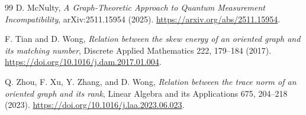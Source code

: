 \documentclass[11pt,a4paper]{article}
\theoremstyle{remark}
\begin{document}
\begin{thebibliography}{99}
D. McNulty, \emph{A Graph-Theoretic Approach to Quantum Measurement
Incompatibility}, arXiv:2511.15954 (2025).
\url{https://arxiv.org/abs/2511.15954}.

F. Tian and D. Wong, \emph{Relation between the skew energy of an oriented
graph and its matching number}, Discrete Applied Mathematics 222, 179--184
(2017). \url{https://doi.org/10.1016/j.dam.2017.01.004}.

Q. Zhou, F. Xu, Y. Zhang, and D. Wong,
\emph{Relation between the trace norm of an oriented graph and its rank},
Linear Algebra and its Applications 675, 204--218 (2023).
\url{https://doi.org/10.1016/j.laa.2023.06.023}.
\end{thebibliography}
\end{document}
